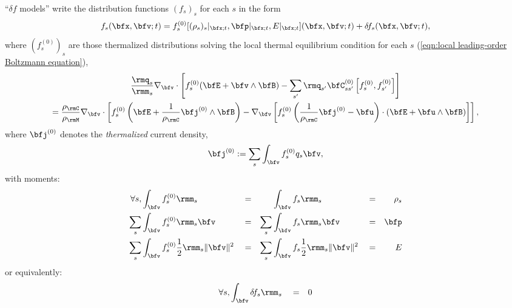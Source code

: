     \begin{definition}\label{def:delta f models}
        ``$\delta\!f$ models'' write the distribution functions $(f_{s})_{s}$ for each $s$ in the form
        \begin{equation}
            f_{s}(\bfx, \bfv; t)  =  f_{s}^{(0)}[(\rho_{s})_{s}|_{\bfx; t}, \bfp|_{\bfx; t}, E|_{\bfx; t}](\bfx, \bfv; t) + \delta\!f_{s}(\bfx, \bfv; t),
        \end{equation}
        where $\left(f_{s}^{(0)}\right)_{s}$ are those thermalized distributions solving the local thermal equilibrium condition for each $s$ (\ref{eqn:local leading-order Boltzmann equation}),
        \begin{multline}\label{eqn:thermal equilibrium identity}
            \frac{\rmq_{s}}{\rmm_{s}}\nabla_{\bfv}\cdot\left[f_{s}^{(0)}(\bfE + \bfv\wedge\bfB) - \sum_{s'}\rmq_{s'}\bfC_{ss'}^{(0)}\left[f_{s}^{(0)}, f_{s'}^{(0)}\right]\right]  \\
            =  \frac{\rho_{\rmC}}{\rho_{\rmM}}\nabla_{\bfv}\cdot\left[f_{s}^{(0)}\left(\bfE + \frac{1}{\rho_{\rmC}}\bfj^{(0)}\wedge\bfB\right) - \nabla_{\bfv}\left[f_{s}^{(0)}\left(\frac{1}{\rho_{\rmC}}\bfj^{(0)} - \bfu\right)\cdot\left(\bfE + \bfu\wedge\bfB\right)\right]\right],
        \end{multline}
        where $\bfj^{(0)}$ denotes the \emph{thermalized} current density,
        \begin{equation}
            \bfj^{(0)}  :=  \sum_{s}\int_{\bfv}f_{s}^{(0)}q_{s}\bfv,
        \end{equation}
        with moments:
        \begin{align}
            \forall s,          &\int_{\bfv}f_{s}^{(0)}\rmm_{s}                         &  &=  &          &\int_{\bfv}f_{s}\rmm_{s}                         &  &=  &  \rho_{s}  \\
                        \sum_{s}&\int_{\bfv}f_{s}^{(0)}\rmm_{s}\bfv                     &  &=  &  \sum_{s}&\int_{\bfv}f_{s}\rmm_{s}\bfv                     &  &=  &  \bfp  \\
                        \sum_{s}&\int_{\bfv}f_{s}^{(0)}\frac{1}{2}\rmm_{s}\|\bfv\|^{2}  &  &=  &  \sum_{s}&\int_{\bfv}f_{s}\frac{1}{2}\rmm_{s}\|\bfv\|^{2}  &  &=  &  E
        \end{align}
        or equivalently:
        \begin{align}
            \forall s,          &\int_{\bfv}\delta\!f_{s}\rmm_{s}                         &  &=  &  0    \label{eqn:correction mass moment}  \\

\end{align}
\end{definition}
